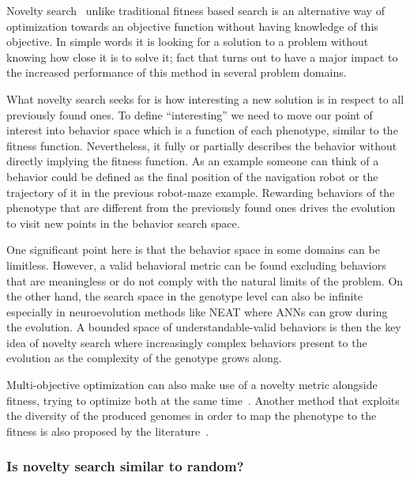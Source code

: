 Novelty search~\citep{lehman2008exploiting,lehman2011abandoning,lehman2010revising, risi2009novelty} unlike traditional fitness based search is an alternative way of optimization towards an objective function without having knowledge of this objective. In simple words it is looking for a solution to a problem without knowing how close it is to solve it; fact that turns out to have a major impact to the increased performance of this method in several problem domains. 

What novelty search seeks for is how interesting a new solution is in respect to all previously found ones. To define ``interesting'' we need to move our point of interest into behavior space which is a function of each phenotype, similar to the fitness function. Nevertheless, it fully or partially describes the behavior without directly implying the fitness function. As an example someone can think of a behavior could be defined as the final position of the navigation robot or the trajectory of it in the previous robot-maze example. Rewarding behaviors of the phenotype that are different from the previously found ones drives the evolution to visit new points in the behavior search space.

One significant point here is that the behavior space in some domains can be limitless. However, a valid behavioral metric can be found excluding behaviors that are meaningless or do not comply with the natural limits of the problem. On the other hand, the search space in the genotype level can also be infinite especially in neuroevolution methods like NEAT where ANNs can grow during the evolution. A bounded space of understandable-valid behaviors is then the key idea of novelty search where increasingly complex behaviors present to the evolution as the complexity of the genotype grows along.

Multi-objective optimization can also make use of a novelty metric alongside fitness, trying to optimize both at the same time~\citep{mouret2011novelty}. Another method that exploits the diversity of the produced genomes in order to map the phenotype to the fitness is also proposed by the literature~\citep{mouret2012algorithm}.

\subsubsection*{Is novelty search similar to random?}


